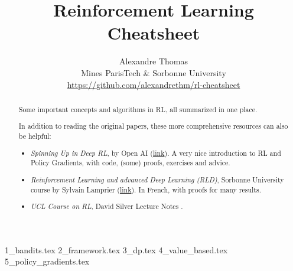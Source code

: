 \documentclass{article}
\title{\Large{Reinforcement Learning Cheatsheet}}
\author{
  Alexandre Thomas\\
  Mines ParisTech \& Sorbonne University\\
  \url{https://github.com/alexandrethm/rl-cheatsheet}
}
\begin{document}
\maketitle

\begin{abstract}
Some important concepts and algorithms in RL, all summarized in one place.

In addition to reading the original papers, these more comprehensive resources can also be helpful:
\begin{itemize}
  \item \emph{Spinning Up in Deep RL}, by Open AI (\href{https://spinningup.openai.com/en/latest/index.html}{link}). A very nice introduction to RL and Policy Gradients, with code, (some) proofs, exercises and advice.
  \item \emph{Reinforcement Learning and advanced Deep Learning (RLD)}, Sorbonne University course by Sylvain Lamprier (\href{https://dac.lip6.fr/master/rladl/}{link}). In French, with proofs for many results.
  \item \emph{UCL Course on RL}, David Silver Lecture Notes \cite{silver2015}.
\end{itemize}
\end{abstract}

\setcounter{tocdepth}{3}
\tableofcontents{}
\newpage

{1_bandits.tex}
{2_framework.tex}
{3_dp.tex}
{4_value_based.tex}
{5_policy_gradients.tex}

\medskip

\footnotesize

\end{document}
